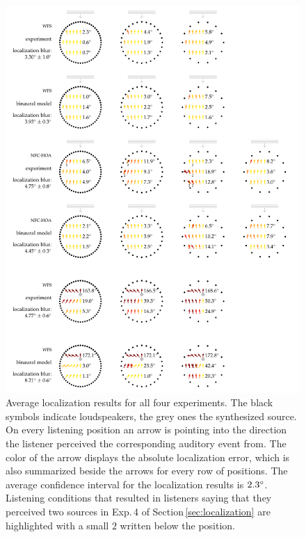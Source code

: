 %
\renewcommand{\thefigure}{\thechapter.\arabic{figure}b} %
\begin{figure}
    \ContinuedFloat %
    \centering
    \hspace*{-1.2cm}\includegraphics{fig6_03/fig6_03b}
    \caption{Average localization results for all four experiments. The black
    symbols indicate loudspeakers, the grey ones the synthesized source. On
    every listening position an arrow is pointing into the direction the
    listener perceived the corresponding auditory event from. The color of the arrow
    displays the absolute localization error, which is also summarized beside
    the arrows for every row of positions. The average confidence interval for
    the localization results is $2.3^\circ$. Listening conditions that
    resulted in listeners saying that they perceived two sources in Exp.\,4 of
    Section\,\protect\ref{sec:localization} are
    highlighted with a small $2$ written below the position.
    }
    \label{fig:localization_results_model}
\end{figure}
